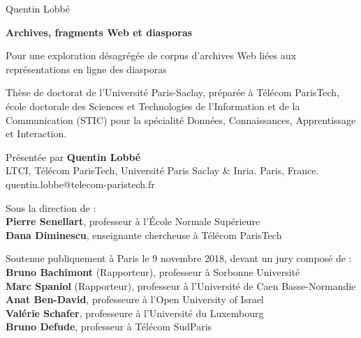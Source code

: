 \documentclass[symmetric,justified,marginals=raggedouter]{tufte-book}
\begin{document}
\frontmatter


\newpage
\cleardoublepage
{  
  \begin{fullwidth}%
  \thispagestyle{empty} 
  \setlength{\parskip}{\baselineskip}
  \begingroup
  \vspace*{3em}
  \par\noindent\Large{Quentin Lobbé}
  \vspace*{-1em}
  \par\noindent\Huge\textbf{Archives, fragments Web et diasporas}  
  \par\noindent\nohyphenation\Large{Pour une exploration désagrégée de corpus d'archives Web liées aux représentations en ligne des diasporas}
  \endgroup
  \vfill  
  
  \par\noindent Thèse de doctorat de l'Université Paris-Saclay, préparée à Télécom ParisTech, école doctorale des Sciences et Technologies de l'Information et de la Communication (STIC) pour la spécialité Données, Connaissances, Apprentissage et Interaction.

  \par\noindent Présentée par \textbf{Quentin Lobbé}\\
  LTCI, Télécom ParisTech, Université Paris Saclay \& Inria. Paris, France.\\
  quentin.lobbe@telecom-paristech.fr

  \par\noindent Sous la direction de :\\
  \textbf{Pierre Senellart}, professeur à l'École Normale Supérieure\\
  \textbf{Dana Diminescu}, enseignante chercheuse à Télécom ParisTech

  \par\noindent Soutenue publiquement à Paris le 9 novembre 2018, devant un jury composé de :\\
  \textbf{Bruno Bachimont} (Rapporteur), professeur à Sorbonne Université\\
  \textbf{Marc Spaniol} (Rapporteur), professeur à l'Université de Caen Basse-Normandie\\
  \textbf{Anat Ben-David}, professeure à l'Open University of Israel\\
  \textbf{Valérie Schafer}, professeure à l'Université du Luxembourg\\
  \textbf{Bruno Defude}, professeur à Télécom SudParis  
  
  \end{fullwidth}%
}
\end{document}
